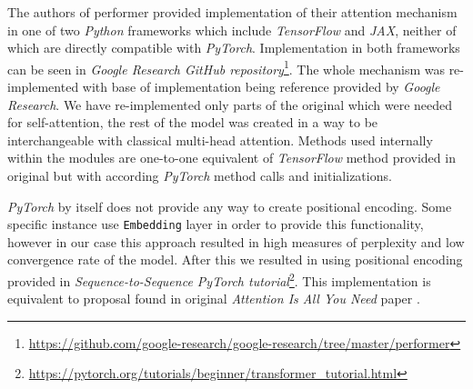 The authors of performer provided implementation of their attention mechanism in one of two \textit{Python} frameworks which include \textit{TensorFlow} and \textit{JAX}, neither of which are directly compatible with \textit{PyTorch}. Implementation in both frameworks can be seen in \textit{Google Research GitHub repository}\footnote{\url{https://github.com/google-research/google-research/tree/master/performer}}. The whole mechanism was re-implemented with base of implementation being reference provided by \textit{Google Research}. We have re-implemented only parts of the original which were needed for self-attention, the rest of the model was created in a way to be interchangeable with classical multi-head attention. Methods used internally within the modules are one-to-one equivalent of \textit{TensorFlow} method provided in original but with according \textit{PyTorch} method calls and initializations.

\textit{PyTorch} by itself does not provide any way to create positional encoding. Some specific instance use \texttt{Embedding} layer in order to provide this functionality, however in our case this approach resulted in high measures of perplexity and low convergence rate of the model. After this we resulted in using positional encoding provided in \textit{Sequence-to-Sequence PyTorch tutorial}\footnote{\url{https://pytorch.org/tutorials/beginner/transformer_tutorial.html}}. This implementation is equivalent to proposal found in original \textit{Attention Is All You Need} paper \cite{DBLP:attention}.

